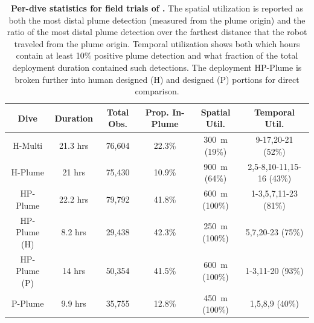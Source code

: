 \begin{table}[h!]
    \centering
    \begin{tabular}{c|c|c|c|c|c}
        Dive & Duration & Total Obs. & Prop. In-Plume & Spatial Util. & Temporal Util.  \\
        \hline
        H-Multi & 21.3 hrs & 76,604 & 22.3\% & \SI{300}{\meter} (19\%) & 9-17,20-21 (52\%) \\
        H-Plume & 21 hrs & 75,430 & 10.9\% & \SI{900}{\meter} (64\%) & 2,5-8,10-11,15-16 (43\%) \\
        \hline
        HP-Plume & 22.2 hrs & 79,792 & 41.8\% & \SI{600}{\meter} (100\%) & 1-3,5,7,11-23 (81\%) \\
        HP-Plume (H) & 8.2 hrs & 29,438 & 42.3\% & \SI{250}{\meter} (100\%) & 5,7,20-23 (75\%) \\
        HP-Plume (P) & 14 hrs & 50,354 & 41.5\% & \SI{600}{\meter} (100\%) &  1-3,11-20 (93\%)\\
        \hline
        P-Plume & 9.9 hrs & 35,755 & 12.8\% & \SI{450}{\meter} (100\%) & 1,5,8,9 (40\%)
    \end{tabular}
    \caption{\textbf{Per-dive statistics for field trials of \PHORTEX.} The spatial utilization is reported as both the most distal plume detection (measured from the plume origin) and the ratio of the most distal plume detection over the farthest distance that the robot traveled from the plume origin. Temporal utilization shows both which hours contain at least 10\% positive plume detection and what fraction of the total deployment duration contained such detections. The deployment HP-Plume is broken further into human designed (H) and \PHORTEX designed (P) portions for direct comparison.}
    \label{tab:field_results}
\end{table}

